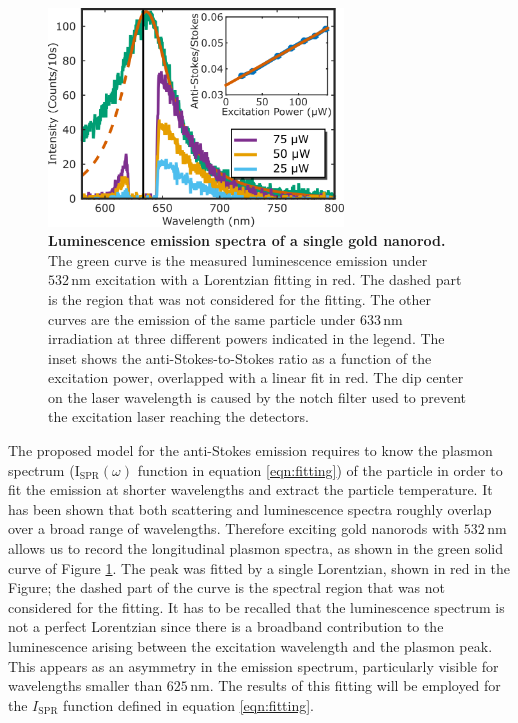 \documentclass[journal=nalefd,manuscript=letter]{achemso}
\newcommand{\nm}{\ensuremath{\,\textrm{nm}}}
\begin{document}
\begin{figure}[tp] \centering
\includegraphics[width=78.4mm]{Figures/02_Several_Intensities/02_several_intensities.png}
\caption{\textbf{Luminescence emission spectra of a single gold nanorod.} The green curve is the
measured luminescence emission under $532\nm$ excitation with a Lorentzian fitting in red. The
dashed part is the region that was not considered for the fitting. The other
curves are the emission of the same particle under $633\nm$ irradiation at three 
different powers indicated in the legend. The inset shows the anti-Stokes-to-Stokes ratio as a function
of the excitation power, overlapped with a linear fit in red. The dip center on the laser wavelength
is caused by the notch filter used to prevent the excitation laser reaching the detectors.}
	\label{fig:spectra_intensity}
\end{figure}

The proposed model for the anti-Stokes emission requires to know the plasmon
spectrum ($\textrm{I}_{\textrm{SPR}}(\omega)$ function in equation \ref{eqn:fitting}) of
the particle in order to fit the emission at shorter wavelengths and extract the
particle temperature. It has been shown that both scattering and luminescence
spectra roughly overlap over a broad range of wavelengths\cite{Yorulmaz2012}. Therefore
exciting gold nanorods with $532\nm$ allows us to record the longitudinal
plasmon spectra, as shown in the green solid curve of Figure \ref{fig:spectra_intensity}. The
peak was fitted by a single Lorentzian, shown in red in the Figure; the dashed
part of the curve is the spectral region that was not considered for the
fitting. It has to be recalled that the luminescence spectrum is not a perfect
Lorentzian since there is a broadband contribution to the luminescence arising
between the excitation wavelength and the plasmon peak\cite{Boyd1986}. This
appears as an asymmetry in the emission spectrum, particularly visible for
wavelengths smaller than $625\nm$. The results of this fitting will be employed
for the $I_\textrm{SPR}$ function defined in equation \ref{eqn:fitting}. 
\end{document}
